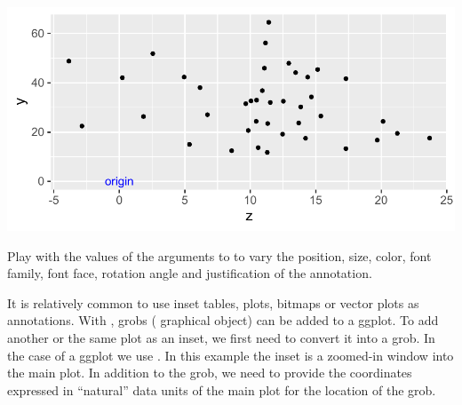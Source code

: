 \documentclass[krantz2]{krantz}\usepackage{knitr}
\begin{document}
\begin{knitrout}\footnotesize
{}\color{fgcolor}\begin{kframe}
\begin{alltt}
  \hlopt{+}
  \hlstd{()} \hlopt{+}
  \hlstd{(} \hlstd{=} \hlstd{,}
            \hlstd{=} \hlstd{,}
            \hlstd{=} \hlstd{,}  \hlstd{=} \hlstd{,}
            \hlstd{=} \hlstd{,}
           \hlstd{=}\hlstd{)}
\end{alltt}
\end{kframe}

{\centering \includegraphics[width=.7\textwidth]{figure/pos-annotate-01-1} 

}



\end{knitrout}

\begin{playground}
Play with the values of the arguments to  to vary the position, size, color, font family, font face, rotation angle and justification of the annotation.
\end{playground}

It is relatively common to use inset tables, plots, bitmaps or vector plots as annotations. With , grobs ( graphical object) can be added to a ggplot. To add another or the same plot as an inset, we first need to convert it into a grob. In the case of a ggplot we use . In this example the inset is a zoomed-in window into the main plot. In addition to the grob, we need to provide the coordinates expressed in ``natural'' data units of the main plot for the location of the grob.
\end{document}
